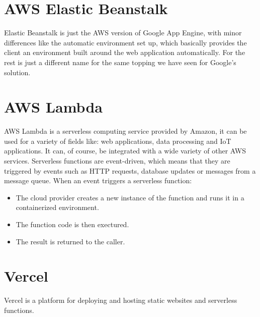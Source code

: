 \section{AWS Elastic Beanstalk}
Elastic Beanstalk is just the AWS version of Google App Engine, with minor differences like the automatic environment set up, which basically provides the client an environment built around the web application automatically. For the rest is just a different name for the same topping we have seen for Google's solution.
\section{AWS Lambda}
AWS Lambda is a serverless computing service provided by Amazon, it can be used for a variety of fields like: web applications, data processing and IoT applications. It can, of course, be integrated with a wide variety of other AWS services. \n
Serverless functions are event-driven, which means that they are triggered by events such as HTTP requests, database updates or messages from a message queue. When an event triggers a serverless function:
\begin{itemize}
    \item The cloud provider creates a new instance of the function and runs it in a containerized environment.
    \item The function code is then exectured.
    \item The result is returned to the caller.
\end{itemize}
\section{Vercel}
Vercel is a platform for deploying and hosting static websites and serverless functions.
